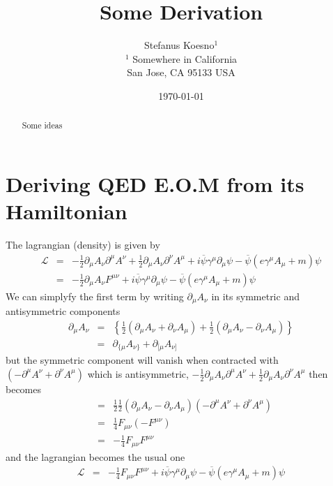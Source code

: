 \documentclass[aps,preprint,preprintnumbers,nofootinbib,showpacs,prd]{revtex4-1}
\newcommand{\nbea}{\begin{eqnarray*}}
\newcommand{\neea}{\end{eqnarray*}}
\begin{document}
\title{Some Derivation}
\bigskip
\author{Stefanus Koesno$^1$\\
$^1$ Somewhere in California\\ San Jose, CA 95133 USA\\
}
%
\date{\today}
%
\begin{abstract}
Some ideas

\end{abstract}
%
\maketitle

\section{Deriving QED E.O.M from its Hamiltonian}

\renewcommand{\theequation}{A.\arabic{equation}}  %
\setcounter{equation}{0}  %

The lagrangian (density) is given by
%
\nbea
\mathcal{L} & = & -\frac{1}{2} \partial_\mu A_\nu \partial^\mu A^\nu + \frac{1}{2} \partial_\mu A_\nu \partial^\nu A^\mu + i \overline \psi \gamma^\mu \partial_\mu \psi - \overline \psi \left ( e \gamma^\mu A_\mu + m\right ) \psi \\
& = & -\frac{1}{2} \partial_\mu A_\nu F^{\mu\nu} + i \overline \psi \gamma^\mu \partial_\mu \psi - \overline \psi \left ( e \gamma^\mu A_\mu + m\right ) \psi
\neea
%
We can simplyfy the first term by writing $\partial_\mu A_\nu$ in its symmetric and antisymmetric components
%
\nbea
\partial_\mu A_\nu & = & \left \{ \frac{1}{2} (\partial_\mu A_\nu + \partial_\nu A_\mu) + \frac{1}{2} (\partial_\mu A_\nu - \partial_\nu A_\mu)\right \} \\
& = & \partial_{\{\mu} A_{\nu\}} + \partial_{[\mu} A_{\nu]}
\neea
%
but the symmetric component will vanish when contracted with $(- \partial^\mu A^\nu + \partial^\nu A^\mu)$ which is antisymmetric, $-\frac{1}{2} \partial_\mu A_\nu \partial^\mu A^\nu + \frac{1}{2} \partial_\mu A_\nu \partial^\nu A^\mu$ then becomes
%
\nbea
& = & \frac{1}{2} \frac{1}{2} (\partial_\mu A_\nu - \partial_\nu A_\mu) (- \partial^\mu A^\nu + \partial^\nu A^\mu) \\
& = & \frac{1}{4} F_{\mu\nu} (-F^{\mu\nu}) \\
& = & -\frac{1}{4} F_{\mu\nu} F^{\mu\nu} 
\neea
%
and the lagrangian becomes the usual one
%
\nbea
\mathcal{L} & = & -\frac{1}{4} F_{\mu\nu} F^{\mu\nu}  + i \overline \psi \gamma^\mu \partial_\mu \psi - \overline \psi \left ( e \gamma^\mu A_\mu + m\right ) \psi
\neea
%
\end{document}
